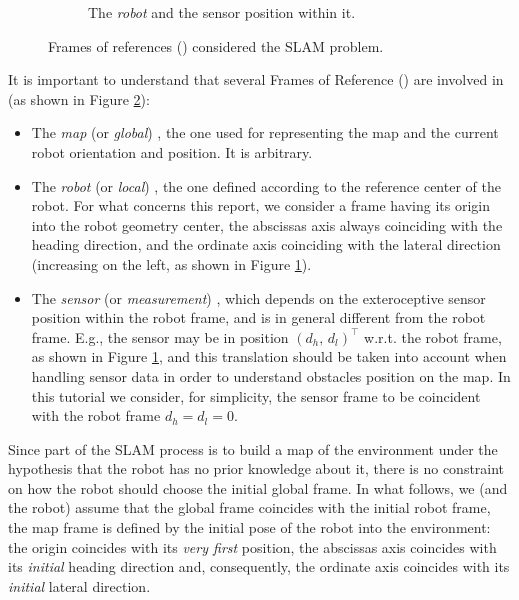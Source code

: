 \begin{figure}
\begin{subfigure}[b]{.38\textwidth}
		\caption{The \emph{robot} \FoR{} and the sensor position within it.}
		\label{fig.fors.robot}
	\end{subfigure}
	\caption{Frames of references (\FoR) considered the SLAM problem.}
	\label{fig.fors}
\end{figure}

It is important to understand that several Frames of Reference (\FoR{}) are involved in \SLAM{} (as shown in Figure \ref{fig.fors}):
\begin{itemize}
	\item The \emph{map} (or \emph{global}) \FoR{}, \ie{} the one used for representing the map and the current robot orientation and position. 
	It is arbitrary.
	
	\item The \emph{robot} (or \emph{local}) \FoR{}, \ie{} the one defined according to the reference center of the robot. 
	For what concerns this report, we consider a frame having its origin into the robot geometry center, the abscissas axis always coinciding with the heading direction, and the ordinate axis coinciding with the lateral direction (increasing on the left, as shown in Figure \ref{fig.fors.robot}).
	
	\item The \emph{sensor} (or \emph{measurement}) \FoR{}, which depends on the exteroceptive sensor position within the robot frame, and is in general different from the robot frame. 
	E.g., the sensor may be in position $(d_h,\, d_l)^\top$ w.r.t. the robot frame, as shown in Figure \ref{fig.fors.robot}, and this translation should be taken into account when handling sensor data in order to understand obstacles position on the map.
	In this tutorial we consider, for simplicity, the sensor frame to be coincident with the robot frame \ie{} $d_h = d_l = 0$.
	
\end{itemize}

Since part of the SLAM process is to build a map of the environment under the hypothesis that the robot has no prior knowledge about it, there is no constraint on how the robot should choose the initial global frame.
In what follows, we (and the robot) assume that the global frame coincides with the initial robot frame, \ie{} the map frame is defined by the initial pose of the robot into the environment: the origin coincides with its \emph{very first} position, the abscissas axis coincides with its \emph{initial} heading direction and, consequently, the ordinate axis coincides with its \emph{initial} lateral direction.

